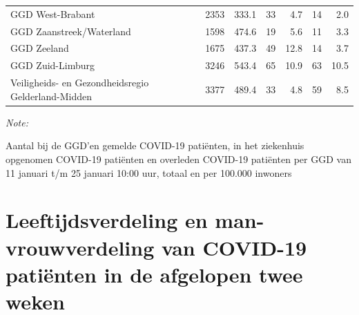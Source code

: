 \documentclass[
  english,
  man,floatsintext]{apa6}
\begin{document}
\begin{table}[H]
\begin{threeparttable}
\begin{tabular}{lrrrrrr}
GGD West-Brabant & 2353 & 333.1 & 33 & 4.7 & 14 & 2.0\\
GGD Zaanstreek/Waterland & 1598 & 474.6 & 19 & 5.6 & 11 & 3.3\\
GGD Zeeland & 1675 & 437.3 & 49 & 12.8 & 14 & 3.7\\
GGD Zuid-Limburg & 3246 & 543.4 & 65 & 10.9 & 63 & 10.5\\
Veiligheids- en Gezondheidsregio Gelderland-Midden & 3377 & 489.4 & 33 & 4.8 & 59 & 8.5\\
\bottomrule
\end{tabular}
\begin{tablenotes}
\item \textit{Note: } 
\item Aantal bij de GGD’en gemelde COVID-19 patiënten, in het ziekenhuis opgenomen COVID-19 patiënten en overleden COVID-19 patiënten per GGD van 11 januari t/m 25 januari 10:00 uur, totaal en per 100.000 inwoners
\end{tablenotes}
\end{threeparttable}
\endgroup{}
\end{table}

\newpage

\hypertarget{leeftijdsverdeling-en-man-vrouwverdeling-van-covid-19-patiuxebnten-in-de-afgelopen-twee-weken}{%
\section{Leeftijdsverdeling en man-vrouwverdeling van COVID-19 patiënten in de afgelopen twee weken}\label{leeftijdsverdeling-en-man-vrouwverdeling-van-covid-19-patiuxebnten-in-de-afgelopen-twee-weken}}
\end{document}

